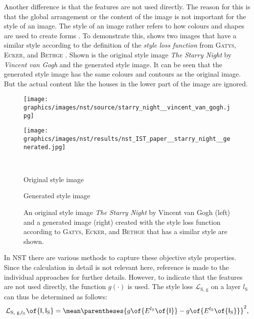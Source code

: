 Another difference is that the features are not used directly. The reason for this is that the global arrangement or the content of the image is not important for the style of an image. The style of an image rather refers to how colours and shapes are used to create forms \cite{Glas2021}. To demonstrate this,  shows two images that have a similar style according to the definition of the \emph{style loss function} from \textsc{Gatys}, \textsc{Ecker}, and \textsc{Bethge} \cite{GEB2016}. Shown is the original style image \emph{The Starry Night} by \emph{Vincent van Gogh} and the generated style image. It can be seen that the generated style image has the same colours and contours as the original image. But the actual content like the houses in the lower part of the image are ignored.
\begin{figure}[h]
	\centering
	\begin{minipage}{.5\textwidth}
		\centering
		\texttt{[image: graphics/images/nst/source/starry\_night\_\_vincent\_van\_gogh.jpg]}
	\end{minipage}%
	\begin{minipage}{.5\textwidth}
		\centering
		\texttt{[image: graphics/images/nst/results/nst\_IST\_paper\_\_starry\_night\_\_generated.jpg]}
	\end{minipage}\\ \vspace{0.15cm}
	\begin{minipage}{.5\textwidth}
		\centering
		Original style image
	\end{minipage}%
	\begin{minipage}{.5\textwidth}
		\centering
		Generated style image
	\end{minipage}
	\caption{An original style image \emph{The Starry Night} by Vincent van Gogh (left) and a generated image (right) created with the style loss function according to \textsc{Gatys}, \textsc{Ecker}, and \textsc{Bethge}\cite{GEB2016} that has a similar style are shown.}
	\label{fig:generated_style_nst}
\end{figure} 
In \gls{NST} there are various methods to capture these objective style properties. Since the calculation in detail is not relevant here, reference is made to the individual approaches for further details\cite{GEB2016,LW2016}. However, to indicate that the features are not used directly, the function $g(\cdot)$ is used. The style loss $\mathcal{L}_\text{S, g}$ on a layer $l_\text{S}$ can thus be determined as follows:
\begin{equation*}
	\mathcal{L}_{\text{S, g}\eqcommasep l_\text{S}}\of{\tensor{I}\eqcommasep \tensor{I}_\text{S}} = \mean \parentheses{g\of{E^{l_\text{S}}\of{\tensor{I}}} - g\of{E^{l_\text{S}}\of{\tensor{I}_\text{S}}}}^2\eqtextcomma
\end{equation*}
